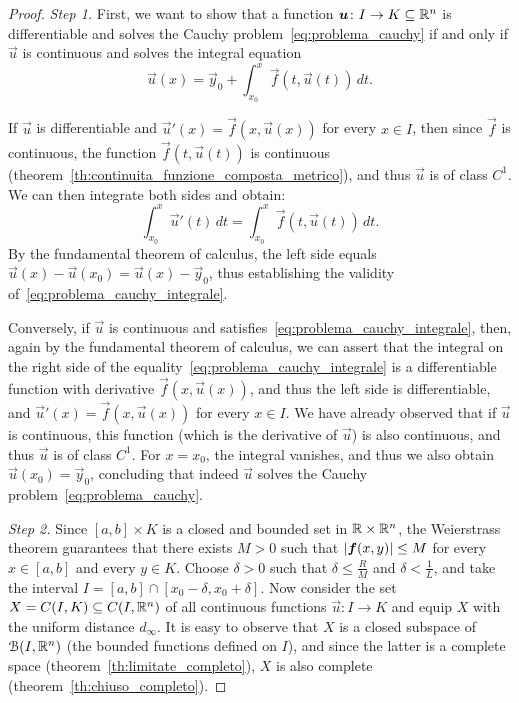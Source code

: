 \begin{proof}
  \emph{Step 1.}
    First, we want to show that a function $\boldsymbol u\colon I\to K\subseteq {\mathbb R}^n$ is
  differentiable and solves the Cauchy problem~\eqref{eq:problema_cauchy} if and
  only if $\vec u$ is continuous and solves the integral equation
  \begin{equation}\label{eq:problema_cauchy_integrale}
  \vec u(x) = \vec y_0 + \int_{x_0}^x \vec f(t,\vec u(t))\, dt.
  \end{equation}

    If $\vec u$ is differentiable and $\vec u'(x) = \vec f(x, \vec u(x))$ for
  every $x\in I$, then since $\vec f$ is continuous, the function $\vec f(t,\vec
  u(t))$ is continuous (theorem~\ref{th:continuita_funzione_composta_metrico}),
  and thus $\vec u$ is of class $C^1$. We can then integrate both sides and
  obtain:
  \[
   \int_{x_0}^x \vec u'(t)\, dt = \int_{x_0}^x \vec f(t,\vec u(t))\, dt.  
  \]
    By the fundamental theorem of calculus, the left side equals $\vec u(x) -
  \vec u(x_0) = \vec u(x) - \vec y_0$, thus establishing the validity
  of~\eqref{eq:problema_cauchy_integrale}.

    Conversely, if $\vec u$ is continuous and
  satisfies~\eqref{eq:problema_cauchy_integrale}, then, again by the fundamental
  theorem of calculus, we can assert that the integral on the right side of the
  equality~\eqref{eq:problema_cauchy_integrale} is a differentiable function
  with derivative $\vec f(x,\vec u(x))$, and thus the left side is
  differentiable, and $\vec u'(x) = \vec f(x,\vec u(x))$ for every $x\in I$. We
  have already observed that if $\vec u$ is continuous, this function (which is
  the derivative of $\vec u$) is also continuous, and thus $\vec u$ is of class
  $C^1$. For $x=x_0$, the integral vanishes, and thus we also obtain $\vec
  u(x_0) = \vec y_0$, concluding that indeed $\vec u$ solves the Cauchy
  problem~\eqref{eq:problema_cauchy}.

  \emph{Step 2.}
    Since $[a,b]\times K$ is a closed and bounded set in ${\mathbb R} \times {\mathbb R}^n$, the
  Weierstrass theorem guarantees that there exists $M>0$ such that ${\left|\boldsymbol f(x,y)\right|}\le M$ for every $x\in [a,b]$ and every $y\in K$. Choose $\delta >0$
  such that $\delta \le \frac{R}{M}$ and $\delta < \frac {1}{L}$, and take the
  interval $I = [a,b]\cap [x_0-\delta,x_0+\delta]$. Now consider the set
  $X=C(I,K)\subseteq C(I,{\mathbb R}^n)$ of all continuous functions $\vec u\colon I\to K$
  and equip $X$ with the uniform distance $d_\infty$. It is easy to observe that
  $X$ is a closed subspace of $\mathcal B(I,{\mathbb R}^n)$ (the bounded functions defined on
  $I$), and since the latter is a complete space
  (theorem~\ref{th:limitate_completo}), $X$ is also complete
  (theorem~\ref{th:chiuso_completo}).


\end{proof}
